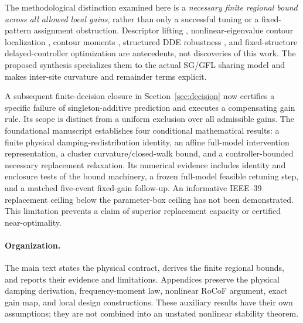 \documentclass[11pt]{article}
\begin{document}
The methodological distinction examined here is a \emph{necessary
finite regional bound across all allowed local gains}, rather than
only a successful tuning or a fixed-pattern assignment obstruction.
Descriptor lifting \cite{peaucelle}, nonlinear-eigenvalue contour
localization \cite{bindel}, contour moments \cite{beyn}, structured
DDE robustness \cite{borgioli}, and fixed-structure delayed-controller
optimization \cite{michielsdesign} are antecedents, not discoveries
of this work. The proposed synthesis specializes them to the actual
SG/GFL sharing model and makes inter-site curvature and remainder
terms explicit.

A subsequent finite-decision closure in Section~\ref{sec:decision} now certifies a specific failure of singleton-additive prediction and executes a compensating gain rule. Its scope is distinct from a uniform exclusion over all admissible gains. The foundational manuscript establishes four conditional mathematical results:
a finite physical damping-redistribution identity, an affine full-model
intervention representation, a cluster curvature/closed-walk bound,
and a controller-bounded necessary replacement relaxation. Its numerical evidence includes identity and enclosure tests of the
bound machinery, a frozen full-model feasible retuning step, and a
matched five-event fixed-gain follow-up. An informative
IEEE--39 replacement ceiling below the parameter-box ceiling has not
been demonstrated. This limitation prevents a claim of superior
replacement capacity or certified near-optimality.

\paragraph{Organization.}
The main text states the physical contract, derives the finite
regional bounds, and reports their evidence and limitations.
Appendices preserve the physical damping derivation, frequency-moment
law, nonlinear RoCoF argument, exact gain map, and local design
constructions. These auxiliary results have their own assumptions;
they are not combined into an unstated nonlinear stability theorem.
\end{document}
